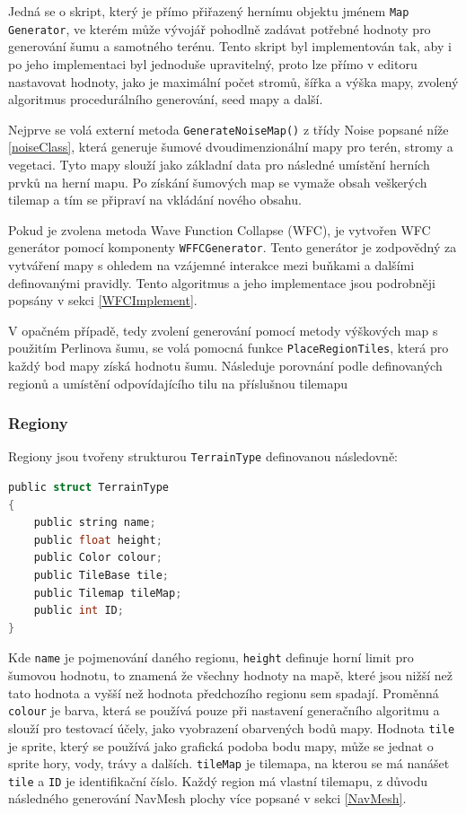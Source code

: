 Jedná se o skript, který je přímo přiřazený hernímu objektu jménem \texttt{Map Generator}, ve kterém může vývojář pohodlně zadávat potřebné hodnoty pro generování šumu a samotného terénu. Tento skript byl implementován tak, aby i po jeho implementaci byl jednoduše upravitelný, proto lze přímo v editoru nastavovat hodnoty, jako je maximální počet stromů, šířka a výška mapy, zvolený algoritmus procedurálního generování, seed mapy a další.

Nejprve se volá externí metoda \texttt{GenerateNoiseMap()} z třídy Noise popsané níže \ref{noiseClass}, která generuje šumové dvoudimenzionální mapy pro terén, stromy a vegetaci. Tyto mapy slouží jako základní data pro následné umístění herních prvků na herní mapu. Po získání šumových map se vymaže obsah veškerých tilemap a tím se připraví na vkládání nového obsahu.

Pokud je zvolena metoda Wave Function Collapse (WFC), je vytvořen WFC generátor pomocí komponenty \texttt{WFFCGenerator}. Tento generátor je zodpovědný za vytváření mapy s ohledem na vzájemné interakce mezi buňkami a dalšími definovanými pravidly. Tento algoritmus a jeho implementace jsou podrobněji popsány v sekci \ref{WFCImplement}.

V opačném případě, tedy zvolení generování pomocí metody výškových map s použitím Perlinova šumu, se volá pomocná funkce \texttt{PlaceRegionTiles}, která pro každý bod mapy získá hodnotu šumu. Následuje porovnání podle definovaných regionů a umístění odpovídajícího tilu na příslušnou tilemapu

\subsubsection{Regiony}
Regiony jsou tvořeny strukturou \texttt{TerrainType} definovanou následovně:
\begin{lstlisting}[language=C]
public struct TerrainType
{
	public string name;
	public float height;
	public Color colour;
	public TileBase tile;
	public Tilemap tileMap;
	public int ID;
}
\end{lstlisting}
Kde \texttt{name} je pojmenování daného regionu, \texttt{height} definuje horní limit pro šumovou hodnotu, to znamená že všechny hodnoty na mapě, které jsou nižší než tato hodnota a vyšší než hodnota předchozího regionu sem spadají. Proměnná \texttt{colour} je barva, která se používá pouze při nastavení generačního algoritmu a slouží pro testovací účely, jako vyobrazení obarvených bodů mapy. Hodnota \texttt{tile} je sprite, který se používá jako grafická podoba bodu mapy, může se jednat o sprite hory, vody, trávy a dalších. \texttt{tileMap} je tilemapa, na kterou se má nanášet \texttt{tile} a \texttt{ID} je identifikační číslo. Každý region má vlastní tilemapu, z důvodu následného generování NavMesh plochy více popsané v sekci \ref{NavMesh}.

